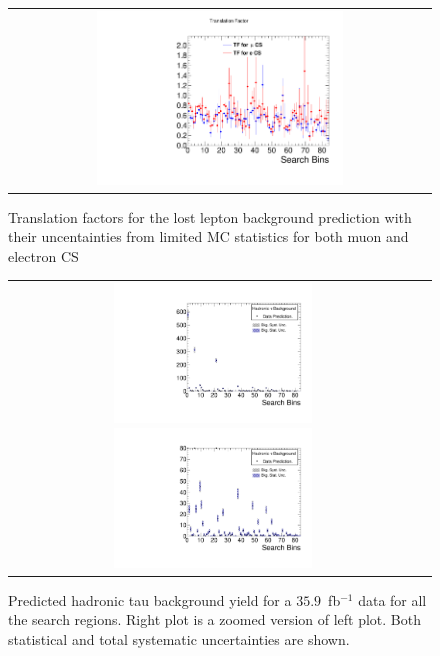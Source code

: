 \begin{figure}[htbp]
  \begin{center}
  \begin{tabular}{c}
  \includegraphics[angle=0,width=0.60\textwidth]{sections/mc4/Backgrounds/TF/figures/comp_TF_lostle_comb.pdf}
  \end{tabular}
  \caption{Translation factors for the lost lepton background prediction with their uncentainties from limited MC statistics for both muon and electron CS}
    \label{fig:lostle_TF}
  \end{center}
\end{figure}

\begin{figure}[htbp]
  \begin{center}
  \begin{tabular}{cc}
  \includegraphics[angle=0,width=0.5\textwidth]{sections/mc4/Backgrounds/TF/figures/pred_full_hadtau_comb.pdf}
  \includegraphics[angle=0,width=0.5\textwidth]{sections/mc4/Backgrounds/TF/figures/pred_zoomin_hadtau_comb.pdf}
  \end{tabular}
  \caption{Predicted hadronic tau background yield for a $35.9$~fb$^{-1}$ data for all the search regions. Right plot is a zoomed version of left plot.
Both statistical and total systematic uncertainties are shown. }
    \label{fig:TAUpredictionSB}
  \end{center}
\end{figure}

